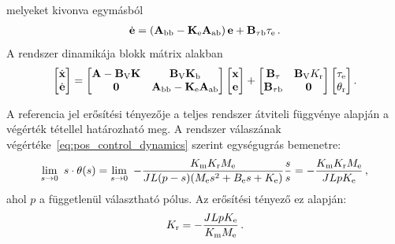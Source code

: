 melyeket kivonva egymásból
\begin{align}
    \dot{\mathbf{e}} = \left(\mathbf{A}_{\mathrm{bb}} - \mathbf{K}_{\mathrm{e}} \mathbf{A}_{\mathrm{ab}}\right) \mathbf{e} + \mathbf{B}_{\mathrm{\tau b}} \tau_{\mathrm{e}}\,.
\end{align}
A rendszer dinamikája blokk mátrix alakban
\begin{align}\label{eq:pos_control_dynamics}
    \begin{bmatrix}
        \dot{\mathbf{x}} \\
        \dot{\mathbf{e}}
    \end{bmatrix}
    =
    \begin{bmatrix}
        \mathbf{A} - \mathbf{B}_{\mathrm{V}} \mathbf{K} & \mathbf{B}_{\mathrm{V}} \mathbf{K}_{\mathrm{b}} \\
        \mathbf{0} & \mathbf{A}_{\mathrm{bb}} - \mathbf{K}_{\mathrm{e}} \mathbf{A}_{\mathrm{ab}}
    \end{bmatrix}
    \begin{bmatrix}
        \mathbf{x} \\
        \mathbf{e}
    \end{bmatrix}
    +
    \begin{bmatrix}
        \mathbf{B}_{\mathrm{\tau}} & \mathbf{B}_{\mathrm{V}} K_{\mathrm{r}}\\
        \mathbf{B}_{\mathrm{\tau b}} & \mathbf{0}
    \end{bmatrix}
    \begin{bmatrix}
        \tau_{\mathrm{e}} \\
        \theta_{\mathrm{r}}
    \end{bmatrix}.
\end{align}

A referencia jel erősítési tényezője a teljes rendszer átviteli függvénye alapján a végérték tétellel határozható meg.
A rendszer válaszának végértéke~\eqref{eq:pos_control_dynamics} szerint egységugrás bemenetre:
\begin{equation}
    \lim_{s \to 0}~s \cdot \theta(s) = 
    \lim_{s \to 0}~-\frac{K_{\mathrm{m}} K_{\mathrm{r}} M_{\mathrm{e}}}{JL(p-s)(M_{\mathrm{e}} s^2 + B_{\mathrm{e}} s + K_{\mathrm{e}})}\frac{s}{s} =
    -\frac{K_{\mathrm{m}} K_{\mathrm{r}} M_{\mathrm{e}}}{JLpK_{\mathrm{e}}}\,,
\end{equation}
ahol \(p\) a függetlenül választható pólus. Az erősítési tényező ez alapján:
\begin{equation}\label{eq:input_coeff}
    K_{\mathrm{r}} = -\frac{JLpK_{\mathrm{e}}}{K_{\mathrm{m}} M_{\mathrm{e}}}\,.
\end{equation}

